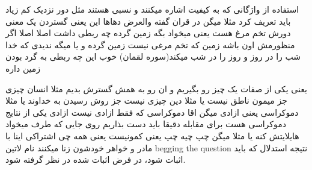 \documentclass{article}
\begin{document}
		 استفاده از واژگانی که به کیفیت اشاره میکنند و نسبی هستند مثل دور نزدیک کم زیاد باید تعریف کرد
		مثلا میگن در قران گفته والعرض دهاها این یعنی گستردن یک معنی دورش تخم مرغ هست یعنی میخواد بگه زمین گرده چه ربطی داشت اصلا اصلا اگر 
		منظورمش اون باشه زمین که تخم مرغی نیست زمین گرده و یا میگه ندیدی که خدا شب را در روز و روز را در شب میکند(سوره لقمان) خوب این چه 
		ربطی به گرد بودن زمین داره
		
		 یعنی یکی از صفات یک چیز رو بگیریم و ان رو به همش گسترش بدیم مثلا انسان چیزی جز میمون ناطق نیست یا مثلا دین 
		چیزی نیست جز روش رسیدن به خداوند یا مثلا دموکراسی یعنی ازادی میگن اقا دموکراسی که فقط ازادی نیست ازادی یکی از نتایج دموکراسی هست 
		برای مقابله دقیقا باید دست بذاریم روی جایی که طرف میخواد هایلایتش کنه یا مثلا میگن چپ چیه چپ یعنی کمونیست یعنی همه چی اشتراکی اینا
		با مادر و خواهر خودشون زنا میکنند
	نام لاتین  begging the question
	نتیجه استدلال که باید اثبات شود،‌ در فرض اثبات شده در نظر گرفته شود.\\
	
	
\end{document}
